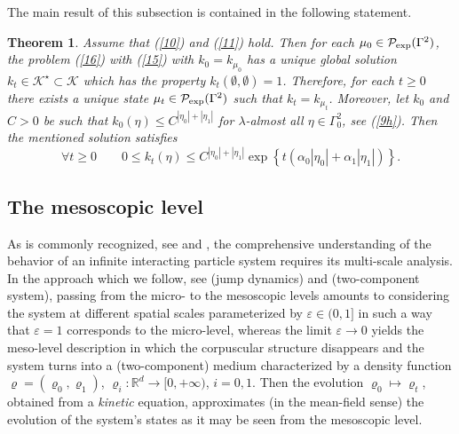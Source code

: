 \documentclass[reqno,11pt]{amsart}
\newtheorem{theorem}{Theorem}[section]
\theoremstyle{definition}
\theoremstyle{remark}
\numberwithin{equation}{section}
\begin{document}
The main result of this subsection is contained in the following
statement.
\begin{theorem}
  \label{1tm}
Assume that (\ref{10}) and (\ref{11}) hold. Then for each $\mu_0 \in
\mathcal{P}_{\rm exp}(\Gamma^2)$, the problem (\ref{16}) with
(\ref{15}) with $k_0 = k_{\mu_0}$  has a unique global solution $k_t
\in \mathcal{K}^\star\subset \mathcal{K}$ which has the property
$k_t(\emptyset, \emptyset) = 1$. Therefore, for each $t\geq 0$ there
exists a unique state $\mu_t\in \mathcal{P}_{\rm exp}(\Gamma^2)$
such that $k_t = k_{\mu_t}$. Moreover, let $k_0$ and $C>0$ be such
that $k_0(\eta) \leq C^{|\eta_0|+ |\eta_1|}$ for $\lambda$-almost
all $\eta\in \Gamma_0^2$, see (\ref{9h}). Then the mentioned
solution satisfies
\begin{equation}
  \label{24d}
 \forall t\geq 0 \qquad 0\leq k_t (\eta) \leq C^{|\eta_0|+ |\eta_1|} \exp\left\{t\left(
 \alpha_0 |\eta_0| + \alpha_1 |\eta_1| \right) \right\}.
\end{equation}
\end{theorem}

\subsection{The mesoscopic level}

\label{SMe}

As is commonly recognized, see \cite[Chapter 8]{BL} and
\cite{Presutti}, the comprehensive understanding of the behavior of
an infinite interacting particle system requires its multi-scale
analysis. In the approach which we follow, see \cite{BKKK} (jump
dynamics) and \cite{FKKO} (two-component system), passing from the
micro- to the mesoscopic levels amounts to considering the system at
different spatial scales parameterized by $\varepsilon \in (0,1]$ in
such a way that $\varepsilon =1$ corresponds to the micro-level,
whereas the limit $\varepsilon \to 0$ yields the meso-level
description in which  the corpuscular structure disappears and the
system turns into a (two-component) medium characterized by a
density function $\varrho = (\varrho_0, \varrho_1)$, $\varrho_i :
\mathds{R}^d \to [0, +\infty)$, $i=0,1$. Then the evolution
$\varrho_0 \mapsto \varrho_t$, obtained from a {\it kinetic}
equation, approximates (in the mean-field sense) the evolution of
the system's states as it may be seen from the mesoscopic level.
\end{document}
